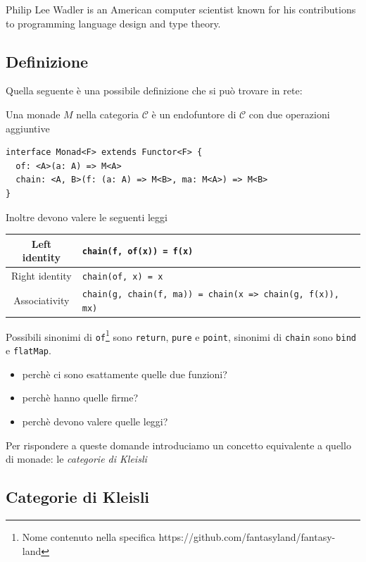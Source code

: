\documentclass[12pt]{article}
\begin{document}
Philip Lee Wadler is an American computer scientist known for his contributions to programming language design and type theory.

\subsection{Definizione}

Quella seguente è una possibile definizione che si può trovare in rete:

Una monade $M$ nella categoria $\mathcal{C}$ è un endofuntore di $\mathcal{C}$ con due operazioni aggiuntive

\begin{verbatim}
interface Monad<F> extends Functor<F> {
  of: <A>(a: A) => M<A>
  chain: <A, B>(f: (a: A) => M<B>, ma: M<A>) => M<B>
}
\end{verbatim}

Inoltre devono valere le seguenti leggi

\begin{center}
\bgroup
\def\arraystretch{1.5}
\begin{tabular}{ |c|p{10cm}| }
\hline
Left identity & \texttt{chain(f, of(x)) = f(x)} \\
\hline
Right identity & \texttt{chain(of, x) = x} \\
\hline
Associativity & \texttt{chain(g, chain(f, ma)) = chain(x => chain(g, f(x)), mx)} \\
\hline
\end{tabular}
\egroup
\end{center}

Possibili sinonimi di \texttt{of}\footnote{Nome contenuto nella specifica https://github.com/fantasyland/fantasy-land} sono \texttt{return}, \texttt{pure} e \texttt{point}, sinonimi di \texttt{chain} sono \texttt{bind} e \texttt{flatMap}.

\begin{itemize}
  \item perchè ci sono esattamente quelle due funzioni?
  \item perchè hanno quelle firme?
  \item perchè devono valere quelle leggi?
\end{itemize}

Per rispondere a queste domande introduciamo un concetto equivalente a quello di monade: le \emph{categorie di Kleisli}

\subsection{Categorie di Kleisli}
\end{document}
